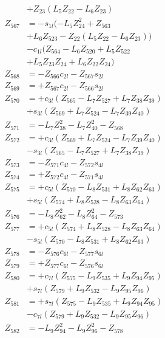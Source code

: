 \begin{multicols}{2}
\begin{align}
&+ Z_{23}(L_5Z_{22} - L_6Z_{23})  \nonumber \\
Z_{567} &= - s_{1l}(- L_5Z_{24}^2 + Z_{563}  \nonumber \\
&+ L_6Z_{523} - Z_{22}(L_5Z_{22} - L_6Z_{23}))  \nonumber \\
&- c_{1l}(Z_{564} - L_6Z_{520} + L_5Z_{522}  \nonumber \\
&+ L_5Z_{23}Z_{24} + L_6Z_{22}Z_{24}) \nonumber \\
Z_{568} &=  - Z_{566}c_{2l} - Z_{567}s_{2l} \nonumber \\
Z_{569} &=  + Z_{567}c_{2l} - Z_{566}s_{2l} \nonumber \\
Z_{570} &= + c_{3l}(Z_{565} - L_7Z_{527} + L_7Z_{38}Z_{39})  \nonumber \\
&+ s_{3l}(Z_{569} + L_7Z_{524} - L_7Z_{39}Z_{40}) \nonumber \\
Z_{571} &= - L_7Z_{38}^2 - L_7Z_{40}^2 - Z_{568}  \nonumber \\
Z_{572} &=  + c_{3l}(Z_{569} + L_7Z_{524} - L_7Z_{39}Z_{40})  \nonumber \\
&- s_{3l}(Z_{565} - L_7Z_{527} + L_7Z_{38}Z_{39}) \nonumber \\
Z_{573} &= - Z_{571}c_{4l} - Z_{572}s_{4l} \nonumber \\
Z_{574} &= + Z_{572}c_{4l} - Z_{571}s_{4l} \nonumber \\
Z_{575} &= + c_{5l}(Z_{570} - L_8Z_{531} + L_8Z_{62}Z_{63})  \nonumber \\
&+ s_{5l}(Z_{574} + L_8Z_{528} - L_8Z_{63}Z_{64}) \nonumber \\
Z_{576} &= - L_8Z_{62}^2 - L_8Z_{64}^2 - Z_{573}  \nonumber \\
Z_{577} &=  + c_{5l}(Z_{574} + L_8Z_{528} - L_8Z_{63}Z_{64})  \nonumber \\
&- s_{5l}(Z_{570} - L_8Z_{531} + L_8Z_{62}Z_{63}) \nonumber \\
Z_{578} &=  - Z_{576}c_{6l} - Z_{577}s_{6l} \nonumber \\
Z_{579} &=  + Z_{577}c_{6l} - Z_{576}s_{6l} \nonumber \\
Z_{580} &=  + c_{7l}(Z_{575} - L_9Z_{535} + L_9Z_{94}Z_{95})  \nonumber \\
&+ s_{7l}(Z_{579} + L_9Z_{532} - L_9Z_{95}Z_{96}) \nonumber \\
Z_{581} &=  + s_{7l}(Z_{575} - L_9Z_{535} + L_9Z_{94}Z_{95})  \nonumber \\
&- c_{7l}(Z_{579} + L_9Z_{532} - L_9Z_{95}Z_{96}) \nonumber \\
Z_{582} &= - L_9Z_{94}^2 - L_9Z_{96}^2 - Z_{578}  \nonumber \\

\end{align}
\end{multicols}

